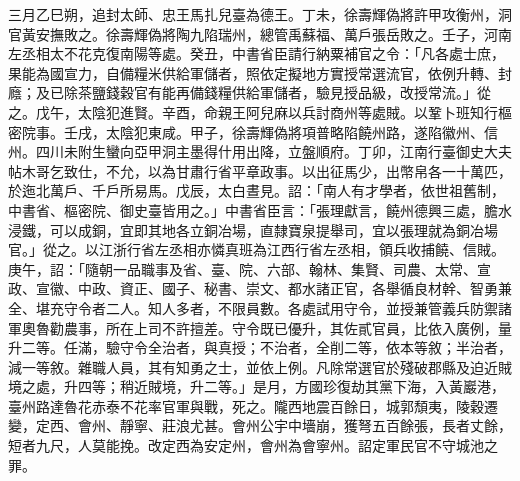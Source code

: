 \begin{pinyinscope}
 三月乙巳朔，追封太師、忠王馬扎兒臺為德王。丁未，徐壽輝偽將許甲攻衡州，洞官黃安撫敗之。徐壽輝偽將陶九陷瑞州，總管禹蘇福、萬戶張岳敗之。壬子，河南左丞相太不花克復南陽等處。癸丑，中書省臣請行納粟補官之令：「凡各處士庶，果能為國宣力，自備糧米供給軍儲者，照依定擬地方實授常選流官，依例升轉、封廕；及已除茶鹽錢穀官有能再備錢糧供給軍儲者，驗見授品級，改授常流。」從之。戊午，太陰犯進賢。辛酉，命親王阿兒麻以兵討商州等處賊。以鞏卜班知行樞密院事。壬戌，太陰犯東咸。甲子，徐壽輝偽將項普略陷饒州路，遂陷徽州、信州。四川未附生蠻向亞甲洞主墨得什用出降，立盤順府。丁卯，江南行臺御史大夫帖木哥乞致仕，不允，以為甘肅行省平章政事。以出征馬少，出幣帛各一十萬匹，於迤北萬戶、千戶所易馬。戊辰，太白晝見。詔：「南人有才學者，依世祖舊制，中書省、樞密院、御史臺皆用之。」中書省臣言：「張理獻言，饒州德興三處，膽水浸鐵，可以成銅，宜即其地各立銅冶場，直隸寶泉提舉司，宜以張理就為銅冶場官。」從之。以江浙行省左丞相亦憐真班為江西行省左丞相，領兵收捕饒、信賊。庚午，詔：「隨朝一品職事及省、臺、院、六部、翰林、集賢、司農、太常、宣政、宣徽、中政、資正、國子、秘書、崇文、都水諸正官，各舉循良材幹、智勇兼全、堪充守令者二人。知人多者，不限員數。各處試用守令，並授兼管義兵防禦諸軍奧魯勸農事，所在上司不許擅差。守令既已優升，其佐貳官員，比依入廣例，量升二等。任滿，驗守令全治者，與真授；不治者，全削二等，依本等敘；半治者，減一等敘。雜職人員，其有知勇之士，並依上例。凡除常選官於殘破郡縣及迫近賊境之處，升四等；稍近賊境，升二等。」是月，方國珍復劫其黨下海，入黃巖港，臺州路達魯花赤泰不花率官軍與戰，死之。隴西地震百餘日，城郭頹夷，陵穀遷變，定西、會州、靜寧、莊浪尤甚。會州公宇中墻崩，獲弩五百餘張，長者丈餘，短者九尺，人莫能挽。改定西為安定州，會州為會寧州。詔定軍民官不守城池之罪。




\end{pinyinscope}
